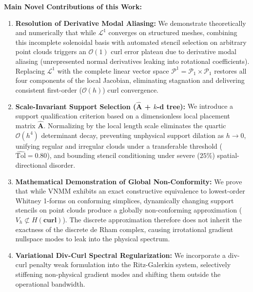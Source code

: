 \documentclass[10.5pt,a4paper]{article}
\begin{document}
\textbf{Main Novel Contributions of this Work:}
\begin{enumerate}[noitemsep,topsep=1pt,parsep=1pt]
    \item \textbf{Resolution of Derivative Modal Aliasing:} We demonstrate theoretically and numerically that while $\mathcal{L}^1$ converges on structured meshes, combining this incomplete solenoidal basis with automated stencil selection on arbitrary point clouds triggers an $\mathcal{O}(1)$ curl error plateau due to derivative modal aliasing (unrepresented normal derivatives leaking into rotational coefficients). Replacing $\mathcal{L}^1$ with the complete linear vector space $\mathcal{P}^1 = \mathcal{P}_1 \times \mathcal{P}_1$ restores all four components of the local Jacobian, eliminating stagnation and delivering consistent first-order ($\mathcal{O}(h)$) curl convergence.
    \item \textbf{Scale-Invariant Support Selection ($\widehat{\mathbf{A}}$ + $k$-d tree):} We introduce a support qualification criterion based on a dimensionless local placement matrix $\widehat{\mathbf{A}}$. Normalizing by the local length scale eliminates the quartic $\mathcal{O}(h^4)$ determinant decay, preventing unphysical support dilation as $h \to 0$, unifying regular and irregular clouds under a transferable threshold ($\widehat{\mathrm{Tol}} = 0.80$), and bounding stencil conditioning under severe ($25\%$) spatial-directional disorder.
    \item \textbf{Mathematical Demonstration of Global Non-Conformity:} We prove that while VNMM exhibits an exact constructive equivalence to lowest-order Whitney 1-forms on conforming simplices, dynamically changing support stencils on point clouds produce a globally non-conforming approximation ($V_h \not\subset H(\mathbf{curl})$). The discrete approximation therefore does not inherit the exactness of the discrete de Rham complex, causing irrotational gradient nullspace modes to leak into the physical spectrum.
    \item \textbf{Variational Div-Curl Spectral Regularization:} We incorporate a div-curl penalty weak formulation into the Ritz-Galerkin system, selectively stiffening non-physical gradient modes and shifting them outside the operational bandwidth.
\end{enumerate}
\end{document}
